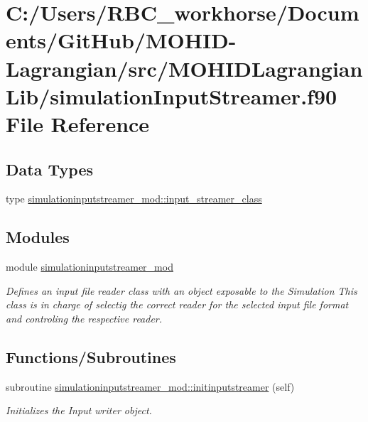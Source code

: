 \hypertarget{simulation_input_streamer_8f90}{}\section{C\+:/\+Users/\+R\+B\+C\+\_\+workhorse/\+Documents/\+Git\+Hub/\+M\+O\+H\+I\+D-\/\+Lagrangian/src/\+M\+O\+H\+I\+D\+Lagrangian\+Lib/simulation\+Input\+Streamer.f90 File Reference}
\label{simulation_input_streamer_8f90}
\subsection*{Data Types}
\begin{DoxyCompactItemize}
\item 
type \mbox{\hyperlink{structsimulationinputstreamer__mod_1_1input__streamer__class}{simulationinputstreamer\+\_\+mod\+::input\+\_\+streamer\+\_\+class}}
\end{DoxyCompactItemize}
\subsection*{Modules}
\begin{DoxyCompactItemize}
\item 
module \mbox{\hyperlink{namespacesimulationinputstreamer__mod}{simulationinputstreamer\+\_\+mod}}
\begin{DoxyCompactList}\small\item\em Defines an input file reader class with an object exposable to the Simulation This class is in charge of selectig the correct reader for the selected input file format and controling the respective reader. \end{DoxyCompactList}\end{DoxyCompactItemize}
\subsection*{Functions/\+Subroutines}
\begin{DoxyCompactItemize}
\item 
subroutine \mbox{\hyperlink{namespacesimulationinputstreamer__mod_a0e5a1e43fe53f179325858d486a284e5}{simulationinputstreamer\+\_\+mod\+::initinputstreamer}} (self)
\begin{DoxyCompactList}\small\item\em Initializes the Input writer object. \end{DoxyCompactList}\end{DoxyCompactItemize}
